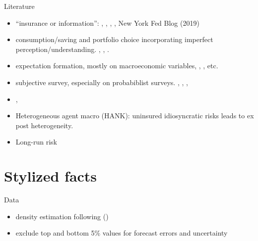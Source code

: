 \documentclass{beamer}
\begin{document}
\begin{frame}{Literature}
\begin{itemize}
	\item ``insurance or information'': \cite{pistaferri_superior_2001}, \cite{kaufmann_disentangling_2009}, \cite{meghir2011earnings}, \cite{flavin_excess_1988}, New York Fed Blog (2019) 
   \item consumption/saving and portfolio choice incorporating imperfect perception/understanding. \cite{rozsypal_overpersistence_2017}, \cite{carroll_sticky_2018}, \cite{lian2019imperfect}.  
   \item expectation formation, mostly on macroeconomic variables, \cite{coibion2012can}, \cite{fuhrer2018intrinsic}, etc. 
   \item subjective survey, especially on probabiblist surveys.  \cite{manski_measuring_2004}, \cite{delavande2011measuring}, \cite{manski_survey_2018}, \item \cite{bertrand_people_2001}, \cite{armantier_overview_2017}
   \item Heterogeneous agent macro (HANK): uninsured idiosyncratic risks leads to ex post heterogeneity. \cite{xxx}
   \item Long-run risk \cite{xxx} 
  \end{itemize}
\end{frame}

\section{Stylized facts}


\begin{frame}{Data}
	\begin{table}
		\centering
		\caption{Survey of Consumer Expectations}
		\label{SCE_data_sum}
	\end{table}
	\begin{itemize}
		\item density estimation following (\cite{engelberg_comparing_2009})
		\item exclude top and bottom 5\% values for forecast errors and uncertainty
	\end{itemize}
\end{frame}
\end{document}
